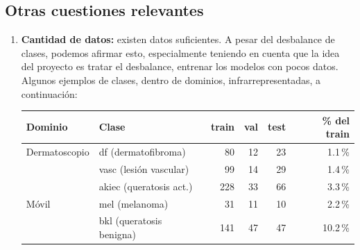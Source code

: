 \documentclass[10pt,a4paper]{article}
\renewcommand{\_}{\guionbajo\allowbreak}
\begin{document}
\subsection{Otras cuestiones relevantes}
\label{subsec:otras}

\begin{enumerate}
    \item \textbf{Cantidad de datos:} existen datos suficientes. A pesar del desbalance de clases, podemos afirmar esto, especialmente
    teniendo en cuenta que la idea del proyecto es tratar el desbalance, entrenar los modelos con pocos
    datos. Algunos ejemplos de clases, dentro de dominios, infrarrepresentadas, a continuación:
    \begin{center}
        \captionsetup{type=table}
    \small
    \renewcommand{\arraystretch}{1.2}
    \begin{tabular}{@{}llrrrr@{}}
        \toprule
        \textbf{Dominio} & \textbf{Clase} & \textbf{train} & \textbf{val} & \textbf{test} & \textbf{\% del train} \\
        \midrule
        Dermatoscopio & df (dermatofibroma)      &  80 & 12 & 23 & 1.1\,\% \\
                      & vasc (lesión vascular)   &  99 & 14 & 29 & 1.4\,\% \\
                      & akiec (queratosis act.)  & 228 & 33 & 66 & 3.3\,\% \\
        \midrule
        Móvil         & mel (melanoma)           &  31 & 11 & 10 & 2.2\,\% \\
                      & bkl (queratosis benigna) & 141 & 47 & 47 & 10.2\,\% \\
        \bottomrule
    \end{tabular}
        \caption{Ejemplos de clases infrarrepresentadas en cada dominio.}
        \label{tab:clases-infrarrepresentadas}
\end{center}


\end{enumerate}
\end{document}
